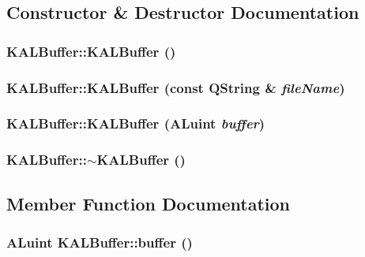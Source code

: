 \subsection{Constructor \& Destructor Documentation}
\hypertarget{class_k_a_l_buffer_12c9ce3c2f62d45a0a28bd9c9a34334e}{
\subsubsection[{KALBuffer}]{\setlength{\rightskip}{0pt plus 5cm}KALBuffer::KALBuffer ()}}
\label{class_k_a_l_buffer_12c9ce3c2f62d45a0a28bd9c9a34334e}


\hypertarget{class_k_a_l_buffer_41851d934abe0141cf801b8f8f7e2bac}{
\subsubsection[{KALBuffer}]{\setlength{\rightskip}{0pt plus 5cm}KALBuffer::KALBuffer (const QString \& {\em fileName})}}
\label{class_k_a_l_buffer_41851d934abe0141cf801b8f8f7e2bac}


\hypertarget{class_k_a_l_buffer_85e879ab2de03e6e3899a8e31805db0b}{
\subsubsection[{KALBuffer}]{\setlength{\rightskip}{0pt plus 5cm}KALBuffer::KALBuffer (ALuint {\em buffer})}}
\label{class_k_a_l_buffer_85e879ab2de03e6e3899a8e31805db0b}


\hypertarget{class_k_a_l_buffer_e8e1a2b13d0838c6ccebba469395107b}{
\subsubsection[{$\sim$KALBuffer}]{\setlength{\rightskip}{0pt plus 5cm}KALBuffer::$\sim$KALBuffer ()}}
\label{class_k_a_l_buffer_e8e1a2b13d0838c6ccebba469395107b}




\subsection{Member Function Documentation}
\hypertarget{class_k_a_l_buffer_a4cc82673706c46f2696f7bae40640b0}{
\subsubsection[{buffer}]{\setlength{\rightskip}{0pt plus 5cm}ALuint KALBuffer::buffer ()}}
\label{class_k_a_l_buffer_a4cc82673706c46f2696f7bae40640b0}


